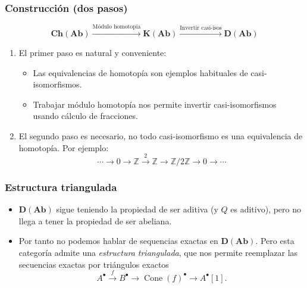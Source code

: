 \documentclass[12pt]{beamer}
\begin{document}
\begin{frame}
  \frametitle{Construcción (dos pasos)}
  \[ \mathbf{Ch}(\mathbf{Ab}) \xrightarrow{\text{Módulo homotopía}} \mathbf{K}(\mathbf{Ab}) \xrightarrow{\text{Invertir casi-isos}} \mathbf{D}(\mathbf{Ab}) \]
  \pause
  \begin{enumerate}
    \item El primer paso es natural y conveniente:
      \begin{itemize}
        \item Las equivalencias de homotopía son ejemplos habituales de casi-isomorfismos.
        \item Trabajar módulo homotopía nos permite invertir casi-isomorfismos usando cálculo de fracciones.
      \end{itemize}
      \pause
    \item El segundo paso es necesario, no todo casi-isomorfismo es una equivalencia de homotopía.
      Por ejemplo:
      \[ \cdots \to 0 \to \mathbb{Z} \xrightarrow{2} \mathbb{Z} \to \mathbb{Z}/2\mathbb{Z} \to 0 \to \cdots \]
  \end{enumerate}
\end{frame}

\begin{frame}
  \frametitle{Estructura triangulada}
  \begin{itemize}
    \item $\mathbf{D}(\mathbf{Ab})$ sigue teniendo la propiedad de ser aditiva (y $Q$ es aditivo), pero no llega a tener la propiedad de ser abeliana.
      \pause

    \item Por tanto no podemos hablar de sequencias exactas en $\mathbf{D}(\mathbf{Ab})$.
      \pause
      Pero esta categoría admite una \textit{estructura triangulada}, que nos permite reemplazar las secuencias exactas por triángulos exactos
      \[ A^{\bullet} \xrightarrow{f} B^{\bullet} \to \operatorname{Cone}(f)^{\bullet} \to A^{\bullet}[1]. \]
  \end{itemize}
\end{frame}
\end{document}
